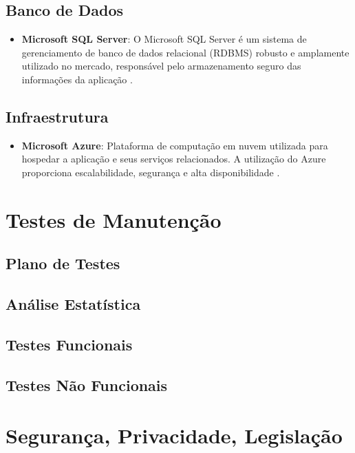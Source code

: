 \documentclass[
	12pt,				%
	openany,			%
	twoside,			%
	a4paper,			%
	english,			%
	brazil				%
	]{abntex2}
\begin{document}
\subsection{Banco de Dados}

\begin{itemize}
    \item \textbf{Microsoft SQL Server}: O Microsoft SQL Server é um sistema de gerenciamento de banco de dados relacional (RDBMS) robusto e amplamente utilizado no mercado, responsável pelo armazenamento seguro das informações da aplicação \cite{SqlServer2025}.


\end{itemize}

\subsection{Infraestrutura}

\begin{itemize}
    \item \textbf{Microsoft Azure}: Plataforma de computação em nuvem utilizada para hospedar a aplicação e seus serviços relacionados. A utilização do Azure proporciona escalabilidade, segurança e alta disponibilidade \cite{Azure2025}.
\end{itemize}



\section{Testes de Manutenção}

\subsection{Plano de Testes}

\subsection{Análise Estatística}

\subsection{Testes Funcionais}

\subsection{Testes Não Funcionais}


\section{Segurança, Privacidade, Legislação}
\end{document}
